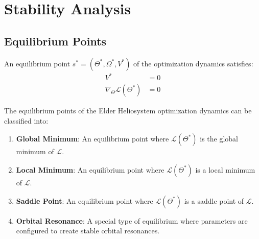 \section{Stability Analysis}

\subsection{Equilibrium Points}

\begin{definition}
An equilibrium point $s^* = (\Theta^*, \Omega^*, V^*)$ of the optimization dynamics satisfies:
\begin{align}
V^* &= 0 \\
\nabla_{\Theta} \mathcal{L}(\Theta^*) &= 0
\end{align}
\end{definition}

\begin{theorem}
The equilibrium points of the Elder Heliosystem optimization dynamics can be classified into:
\begin{enumerate}
    \item \textbf{Global Minimum}: An equilibrium point where $\mathcal{L}(\Theta^*)$ is the global minimum of $\mathcal{L}$.
    \item \textbf{Local Minimum}: An equilibrium point where $\mathcal{L}(\Theta^*)$ is a local minimum of $\mathcal{L}$.
    \item \textbf{Saddle Point}: An equilibrium point where $\mathcal{L}(\Theta^*)$ is a saddle point of $\mathcal{L}$.
    \item \textbf{Orbital Resonance}: A special type of equilibrium where parameters are configured to create stable orbital resonances.
\end{enumerate}
\end{theorem}

